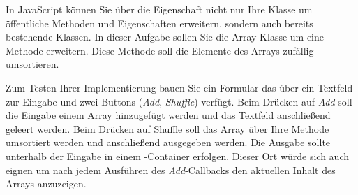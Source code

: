 %
\par In JavaScript können Sie über die  Eigenschaft nicht nur
Ihre Klasse um öffentliche Methoden und Eigenschaften erweitern, sondern auch
bereits bestehende Klassen. In dieser Aufgabe sollen Sie die Array-Klasse um
eine Methode  erweitern. Diese Methode soll die Elemente des
Arrays zufällig umsortieren.
%
\par Zum Testen Ihrer Implementierung bauen Sie ein Formular das über ein
Textfeld zur Eingabe und zwei Buttons (\emph{Add}, \emph{Shuffle}) verfügt.
Beim Drücken auf \emph{Add} soll die Eingabe einem Array hinzugefügt werden und
das Textfeld anschließend geleert werden. Beim Drücken auf Shuffle soll das
Array über Ihre Methode umsortiert werden und anschließend ausgegeben werden.
Die Ausgabe sollte unterhalb der Eingabe in einem -Container
erfolgen. Dieser Ort würde sich auch eignen um nach jedem Ausführen des
\emph{Add}-Callbacks den aktuellen Inhalt des Arrays anzuzeigen.